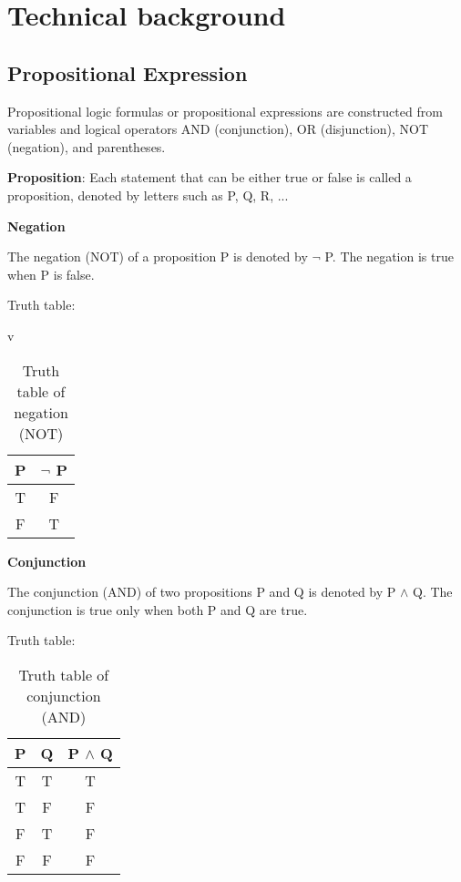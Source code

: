 \section{Technical background}
\subsection{Propositional Expression}
Propositional logic formulas or propositional expressions are constructed from variables
and logical operators AND (conjunction), OR (disjunction), NOT (negation), and
parentheses.

\textbf{Proposition}: Each statement that can be either true or false is called a proposition,
denoted by letters such as P, Q, R, ...

\textbf{Negation}

The negation (NOT) of a proposition P is denoted by $\lnot$ P. The negation
is true when P is false.

Truth table:
\begin{table}[H]
    \centering
    \caption{Truth table of negation (NOT)}
    \label{tab:truth_table_negation}v
    \begin{tabular}{|c|c|}
        \hline
        P & $\lnot$ P \\
        \hline
        T & F         \\
        F & T         \\
        \hline
    \end{tabular}
\end{table}

\textbf{Conjunction}

The conjunction (AND) of two propositions P and Q is denoted by P
$\land$ Q. The conjunction is true only when both P and Q are true.

Truth table:
\begin{table}[H]
    \centering
    \caption{Truth table of conjunction (AND)}
    \label{tab:truth_table_conjunction}
    \begin{tabular}{|c|c|c|}
        \hline
        P & Q & P $\land$ Q \\
        \hline
        T & T & T           \\
        T & F & F           \\
        F & T & F           \\
        F & F & F           \\
        \hline
    \end{tabular}
\end{table}

